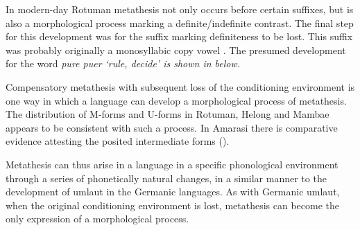 In modern-day Rotuman metathesis not only occurs before certain
suffixes, but is also a morphological process marking 
a definite/indefinite contrast.
The final step for this development was for the suffix marking definiteness to be lost.
This suffix was probably originally a monosyllabic copy vowel \citep{gr59,blga98}.
The presumed development for the word \it{pure {\ra} puer} `rule, decide'
is shown in  below.

\begin{exe}\let\eachwordone=\textnormal
	\label{ex:pure>puer}
\end{exe}

Compensatory metathesis with subsequent loss of the conditioning environment is
one way in which a language can develop a morphological process of metathesis.
The distribution of M-forms and U-forms in Rotuman, Helong and Mambae
appears to be consistent with such a process.
In Amarasi there is comparative evidence attesting the posited
intermediate forms ().

Metathesis can thus arise in a language in a specific phonological environment
through a series of phonetically natural changes,
in a similar manner to the development of umlaut in the Germanic languages.
As with Germanic umlaut, when the original conditioning environment is lost,
metathesis can become the only expression of a morphological process.
